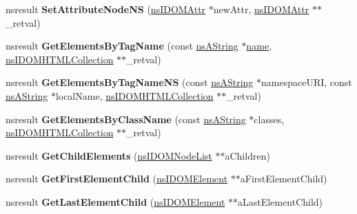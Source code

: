 \begin{DoxyCompactItemize}
nsresult {\bfseries Set\+Attribute\+Node\+NS} (\hyperlink{interfacens_i_d_o_m_attr}{ns\+I\+D\+O\+M\+Attr} $\ast$new\+Attr, \hyperlink{interfacens_i_d_o_m_attr}{ns\+I\+D\+O\+M\+Attr} $\ast$$\ast$\+\_\+retval)
\item 
\mbox{\label{interfacens_i_d_o_m_element_a64bd589db57622122662364665688525}} 
nsresult {\bfseries Get\+Elements\+By\+Tag\+Name} (const \hyperlink{structns_string_container}{ns\+A\+String} $\ast$\hyperlink{structname}{name}, \hyperlink{interfacens_i_d_o_m_h_t_m_l_collection}{ns\+I\+D\+O\+M\+H\+T\+M\+L\+Collection} $\ast$$\ast$\+\_\+retval)
\item 
\mbox{\label{interfacens_i_d_o_m_element_a82eb7674831e10d9e6de1c1f0308263c}} 
nsresult {\bfseries Get\+Elements\+By\+Tag\+Name\+NS} (const \hyperlink{structns_string_container}{ns\+A\+String} $\ast$namespace\+U\+RI, const \hyperlink{structns_string_container}{ns\+A\+String} $\ast$local\+Name, \hyperlink{interfacens_i_d_o_m_h_t_m_l_collection}{ns\+I\+D\+O\+M\+H\+T\+M\+L\+Collection} $\ast$$\ast$\+\_\+retval)
\item 
\mbox{\label{interfacens_i_d_o_m_element_a86ece6aea0d346cbe2f1583d8b66ae8c}} 
nsresult {\bfseries Get\+Elements\+By\+Class\+Name} (const \hyperlink{structns_string_container}{ns\+A\+String} $\ast$classes, \hyperlink{interfacens_i_d_o_m_h_t_m_l_collection}{ns\+I\+D\+O\+M\+H\+T\+M\+L\+Collection} $\ast$$\ast$\+\_\+retval)
\item 
\mbox{\label{interfacens_i_d_o_m_element_a8d7b1dc343b0da5bbb777d97955f7df3}} 
nsresult {\bfseries Get\+Child\+Elements} (\hyperlink{interfacens_i_d_o_m_node_list}{ns\+I\+D\+O\+M\+Node\+List} $\ast$$\ast$a\+Children)
\item 
\mbox{\label{interfacens_i_d_o_m_element_a7b68bae61860642c2b34ffc7a42498da}} 
nsresult {\bfseries Get\+First\+Element\+Child} (\hyperlink{interfacens_i_d_o_m_element}{ns\+I\+D\+O\+M\+Element} $\ast$$\ast$a\+First\+Element\+Child)
\item 
\mbox{\label{interfacens_i_d_o_m_element_aba661e44062f2633db953082bc541c6c}} 
nsresult {\bfseries Get\+Last\+Element\+Child} (\hyperlink{interfacens_i_d_o_m_element}{ns\+I\+D\+O\+M\+Element} $\ast$$\ast$a\+Last\+Element\+Child)
$$
\end{DoxyCompactItemize}
